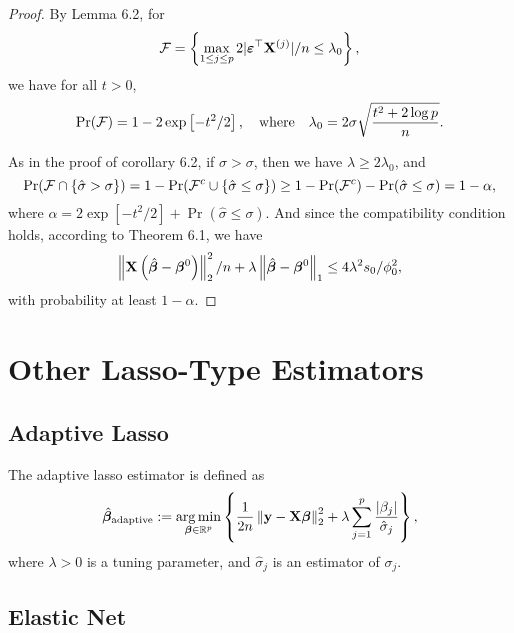 \begin{proof}
	By Lemma 6.2, for
	\begin{equation*}
		{\mathcal F}=\left\{\max_{1\leq j\leq p}2|\boldsymbol{\varepsilon}^{\top}{\bf X}^{(j)}|/n\leq\lambda_{0}\right\},
	\end{equation*}
	we have for all $t>0$,
	\begin{equation*}
		\Pr({\mathcal F})=1-2\exp\left[-t^{2}/2\right],\quad\text{where}\quad\lambda_{0}=2\sigma\sqrt{\frac{t^{2}+2\log p}{n}}.
	\end{equation*}

	As in the proof of corollary 6.2, if $\hat{\sigma}>\sigma$, then we have $\lambda\geq 2\lambda_{0}$, and
	\begin{equation*}
		\Pr({\mathcal F}\cap\{\hat{\sigma}>\sigma\})=1-\Pr({\mathcal F}^{c}\cup\{\hat{\sigma}\leq\sigma\})\geq 1-\Pr({\mathcal F}^{c})-\Pr(\hat{\sigma}\leq\sigma)=1-\alpha,
	\end{equation*}
	where $\alpha=2\exp\left[-t^{2}/2\right]+\Pr(\hat{\sigma}\leq\sigma)$. And since the compatibility condition holds, according to Theorem 6.1, we have
	\begin{equation*}
		\left\|{\bf X}\left(\hat{\boldsymbol{\beta}}-\boldsymbol{\beta}^{0}\right)\right\|_{2}^{2}/n+\lambda\left\|\hat{\boldsymbol{\beta}}-\boldsymbol{\beta}^{0}\right\|_{1}\leq 4 \lambda^{2}s_{0}/\phi_{0}^{2},
	\end{equation*}
	with probability at least $1-\alpha$.
\end{proof}

\section{Other Lasso-Type Estimators}

\subsection{Adaptive Lasso}

The adaptive lasso estimator is defined as
\begin{equation*}
	\hat{\boldsymbol{\beta}}_{\text{adaptive}}:=\underset{\boldsymbol{\beta}\in{\mathbb R}^{p}}{\arg\min}\left\{\frac{1}{2n}\left\|{\bf y}-{\bf X}\boldsymbol{\beta}\right\|_{2}^{2}+\lambda\sum_{j=1}^{p}\frac{\left|\beta_{j}\right|}{\hat{\sigma}_{j}}\right\},
\end{equation*}
where $\lambda>0$ is a tuning parameter, and $\hat{\sigma}_{j}$ is an estimator of $\sigma_{j}$.

\subsection{Elastic Net}

